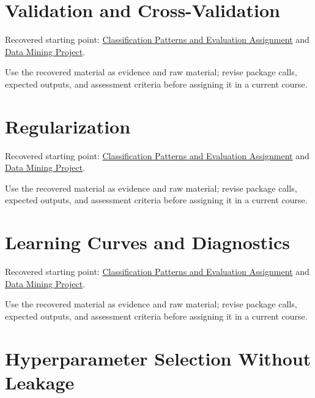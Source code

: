 \documentclass[
  letterpaper,
]{scrbook}
\begin{document}
\section*{Validation and
Cross-Validation}\label{sec-pr-15-validation-and-cross-validation}


Recovered starting point:
\hyperref[sec-lab-classification-patterns-assignment]{Classification
Patterns and Evaluation Assignment} and
\hyperref[sec-lab-data-mining-project]{Data Mining Project}.

Use the recovered material as evidence and raw material; revise package
calls, expected outputs, and assessment criteria before assigning it in
a current course.

\section*{Regularization}\label{sec-pr-15-regularization}


Recovered starting point:
\hyperref[sec-lab-classification-patterns-assignment]{Classification
Patterns and Evaluation Assignment} and
\hyperref[sec-lab-data-mining-project]{Data Mining Project}.

Use the recovered material as evidence and raw material; revise package
calls, expected outputs, and assessment criteria before assigning it in
a current course.

\section*{Learning Curves and
Diagnostics}\label{sec-pr-15-learning-curves-and-diagnostics}


Recovered starting point:
\hyperref[sec-lab-classification-patterns-assignment]{Classification
Patterns and Evaluation Assignment} and
\hyperref[sec-lab-data-mining-project]{Data Mining Project}.

Use the recovered material as evidence and raw material; revise package
calls, expected outputs, and assessment criteria before assigning it in
a current course.

\section*{Hyperparameter Selection Without
Leakage}\label{sec-pr-15-hyperparameter-selection-without-leakage}
\end{document}
